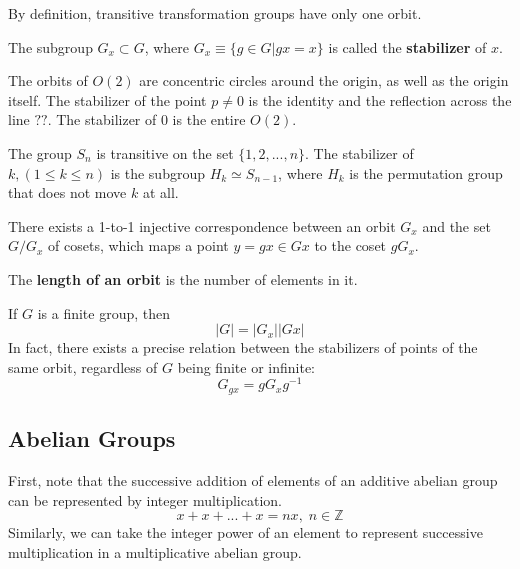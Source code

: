   By definition, transitive transformation groups have only one orbit.

  \begin{definition}
    The subgroup $G_{x} \subset G$, where $G_{x} \equiv \{ g \in G | g x = x\}$ is called the \textbf{stabilizer} of $x$.
  \end{definition}

  \begin{example}
    The orbits of $O(2)$ are concentric circles around the origin, as well as the origin itself. The stabilizer of the point $p \neq 0$ is the identity and the reflection across the line $??$. The stabilizer of $0$ is the entire $O(2)$.
  \end{example}

  \begin{example}
    The group $S_n$ is transitive on the set $\{1, 2, ..., n\}$. The stabilizer of $k, (1 \leq k \leq n)$ is the subgroup $H_{k} \simeq S_{n-1}$, where $H_k$ is the permutation group that does not move $k$ at all. 
  \end{example}

  \begin{theorem}
    There exists a 1-to-1 injective correspondence between an orbit $G_x$ and the set $G / G_{x}$ of cosets, which maps a point $y = g x \in G x $ to the coset $g G_x$. 
  \end{theorem}

  \begin{definition}
    The \textbf{length of an orbit} is the number of elements in it. 
  \end{definition}

  \begin{corollary}
    If $G$ is a finite group, then 
    \begin{equation}
      |G| = |G_x| |G x|
    \end{equation}
    In fact, there exists a precise relation between the stabilizers of points of the same orbit, regardless of $G$ being finite or infinite: 
    \begin{equation}
      G_{g x} = g G_{x} g^{-1}
    \end{equation}
  \end{corollary}

\subsection{Abelian Groups}

  First, note that the successive addition of elements of an additive abelian group can be represented by integer multiplication. 
  \begin{equation}
    x + x + ... + x = n x, \; n \in \mathbb{Z}
  \end{equation}
  Similarly, we can take the integer power of an element to represent successive multiplication in a multiplicative abelian group. 

